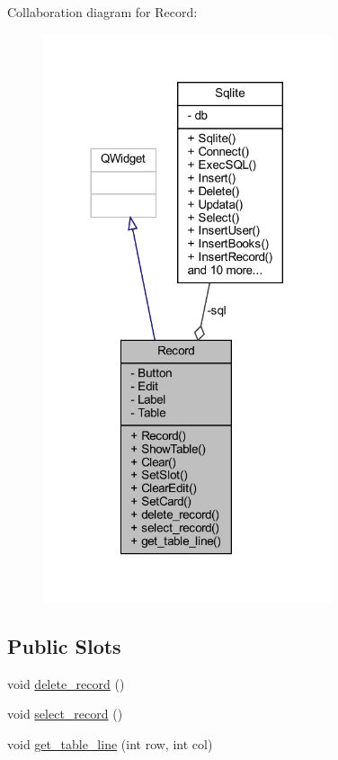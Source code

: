Collaboration diagram for Record\+:
\nopagebreak
\begin{figure}[H]
\begin{center}
\leavevmode
\includegraphics[width=240pt]{class_record__coll__graph}
\end{center}
\end{figure}
\subsection*{Public Slots}
\begin{DoxyCompactItemize}
\item 
void \mbox{\hyperlink{class_record_a4c0e51ba399bdec6c9630b193914e7fb}{delete\+\_\+record}} ()
\item 
void \mbox{\hyperlink{class_record_a5fdd1f2b39a2de50ec73b57bb24bb8dc}{select\+\_\+record}} ()
\item 
void \mbox{\hyperlink{class_record_a89ae432465b31de8a27e2fe8e929b62a}{get\+\_\+table\+\_\+line}} (int row, int col)
\end{DoxyCompactItemize}
